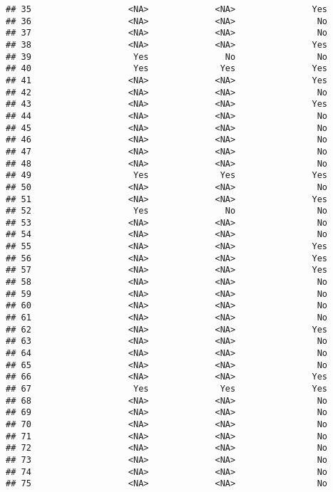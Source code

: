 \documentclass[
]{article}
\begin{document}
\begin{verbatim}
## 35                   <NA>             <NA>               Yes
## 36                   <NA>             <NA>                No
## 37                   <NA>             <NA>                No
## 38                   <NA>             <NA>               Yes
## 39                    Yes               No                No
## 40                    Yes              Yes               Yes
## 41                   <NA>             <NA>               Yes
## 42                   <NA>             <NA>                No
## 43                   <NA>             <NA>               Yes
## 44                   <NA>             <NA>                No
## 45                   <NA>             <NA>                No
## 46                   <NA>             <NA>                No
## 47                   <NA>             <NA>                No
## 48                   <NA>             <NA>                No
## 49                    Yes              Yes               Yes
## 50                   <NA>             <NA>                No
## 51                   <NA>             <NA>               Yes
## 52                    Yes               No                No
## 53                   <NA>             <NA>                No
## 54                   <NA>             <NA>                No
## 55                   <NA>             <NA>               Yes
## 56                   <NA>             <NA>               Yes
## 57                   <NA>             <NA>               Yes
## 58                   <NA>             <NA>                No
## 59                   <NA>             <NA>                No
## 60                   <NA>             <NA>                No
## 61                   <NA>             <NA>                No
## 62                   <NA>             <NA>               Yes
## 63                   <NA>             <NA>                No
## 64                   <NA>             <NA>                No
## 65                   <NA>             <NA>                No
## 66                   <NA>             <NA>               Yes
## 67                    Yes              Yes               Yes
## 68                   <NA>             <NA>                No
## 69                   <NA>             <NA>                No
## 70                   <NA>             <NA>                No
## 71                   <NA>             <NA>                No
## 72                   <NA>             <NA>                No
## 73                   <NA>             <NA>                No
## 74                   <NA>             <NA>                No
## 75                   <NA>             <NA>                No

\end{verbatim}
\end{document}
